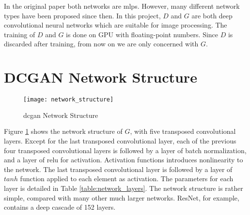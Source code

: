 In the original paper both networks are \glspl{mlp}. However, many different network types have been
proposed since then. In this project, $D$ and $G$ are both deep convolutional neural networks which are
suitable for image processing. The training of $D$ and $G$ is done on GPU with floating-point numbers. Since
$D$ is discarded after training, from now on we are only concerned with $G$.

\section{DCGAN Network Structure}

\begin{figure}[h]
  \centering
  \texttt{[image: network\_structure]}
  \caption{\gls{dcgan} Network Structure}
  \label{fig:network_structure}
\end{figure}

Figure \ref{fig:network_structure} shows the network structure of $G$, with five transposed convolutional
layers. Except for the last transposed convolutional layer, each of the previous four transposed convolutional
layers is followed by a layer of batch normalization, and a layer of \gls{relu} for
activation. Activation functions introduces nonlinearity to the network. The last transposed convolutional
layer is followed by a layer of $tanh$ function applied to each element as activation. The parameters for
each layer is detailed in Table \ref{table:network_layers}.  The network structure is rather simple,
compared with many other much larger networks. ResNet, for example, contains a deep cascade of 152 layers.

